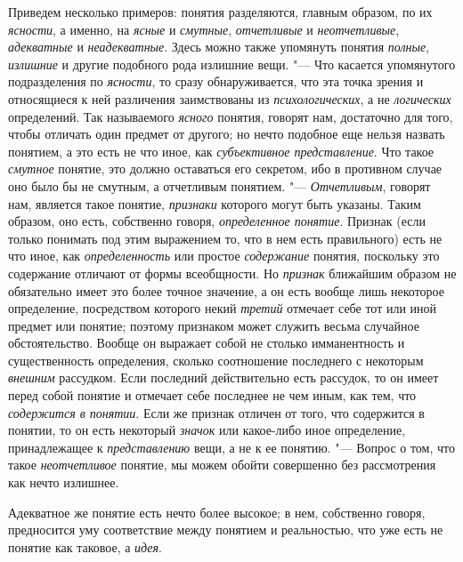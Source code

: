 {Приведем несколько примеров: понятия разделяются, главным
образом, по их {\em ясности},
а именно, на {\em ясные}
и {\em смутные},
{\em отчетливые} и
{\em неотчетливые},
{\em адекватные} и
{\em неадекватные}. Здесь
можно также упомянуть понятия
{\em полные},
{\em излишние} и другие
подобного рода излишние вещи. "--- Что касается упомянутого
подразделения по {\em ясности},
то сразу обнаруживается, что эта точка зрения и относящиеся к
ней различения заимствованы из
{\em психологических}, а
не {\em логических}
определений. Так называемого
{\em ясного} понятия,
говорят нам, достаточно для того, чтобы отличать один предмет от другого;
но нечто подобное еще нельзя назвать понятием, а это есть не что иное, как
{\em субъективное представление}.
Что такое {\em смутное}
понятие, это должно оставаться его секретом, ибо в противном
случае оно было бы не смутным, а отчетливым понятием. "---
{\em Отчетливым}, говорят
нам, является такое понятие,
{\em признаки} которого
могут быть указаны. Таким образом, оно есть, собственно говоря,
{\em определенное понятие}.
Признак (если только понимать под этим выражением то, что в
нем есть правильного) есть не что иное, как
{\em определенность} или
простое {\em содержание}
понятия, поскольку это содержание отличают от формы
всеобщности. Но {\em признак}
ближайшим образом не обязательно имеет это более точное
значение, а он есть вообще лишь некоторое определение, посредством которого
некий {\em третий}
отмечает себе тот или иной предмет или понятие; поэтому
признаком может служить весьма случайное обстоятельство. Вообще он выражает
собой не столько имманентность и существенность определения, сколько
соотношение последнего с некоторым
{\em внешним} рассудком.
Если последний действительно есть рассудок, то он имеет перед собой понятие
и отмечает себе последнее не чем иным, как тем, что
{\em содержится в понятии}.
Если же признак отличен от того, что содержится в понятии, то
он есть некоторый {\em значок}
или какое-либо иное определение, принадлежащее к
{\em представлению} вещи,
а не к ее понятию. "--- Вопрос о том, что такое
{\em неотчетливое}
понятие, мы можем обойти совершенно без рассмотрения как
нечто излишнее.

Адекватное же понятие есть нечто более высокое; в нем,
собственно говоря, предносится уму соответствие между понятием и
реальностью, что уже есть не понятие как таковое, а
{\em идея}.

}
